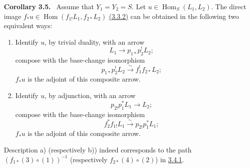 \documentclass[11pt]{article}
\newenvironment{statement}[1]{\par\medskip\noindent\textbf{#1.}\ }{\par\medskip}
\DeclareMathOperator{\Hom}{Hom}
\providecommand{\Hom}{\operatorname{Hom}}
\providecommand{\Hom}{\operatorname{Hom}}
\begin{document}
\label{sga5:III:corollary:3.5}\begin{statement}{Corollary 3.5}
Assume that $Y_1=Y_2=S$. Let $u\in\Hom_S(L_1,L_2)$. The direct image $f_*u\in\Hom(f_{1!}L_1,f_{2*}L_2)$ \hyperref[sga5:III:equation:3.3.2]{(3.3.2)} can be obtained in the following two equivalent ways:
\end{statement}
\begin{enumerate}[label=\alph*)]
\item Identify $u$, by trivial duality, with an arrow
\[
L_1\longrightarrow p_{1*}p_2^!L_2;
\]
compose with the base-change isomorphism
\[
p_{1*}p_2^!L_2\xrightarrow{\sim}f_1^!f_{2*}L_2;
\]
$f_*u$ is the adjoint of this composite arrow.
\item Identify $u$, by adjunction, with an arrow
\[
p_{2!}p_1^*L_1\longrightarrow L_2;
\]
compose with the base-change isomorphism
\[
f_2^*f_{1!}L_1\xrightarrow{\sim}p_{2!}p_1^*L_1;
\]
$f_*u$ is the adjoint of this composite arrow.
\end{enumerate}
Description a) (respectively b)) indeed corresponds to the path $(f_{1*}(3)\circ(1))^{-1}$ (respectively $f_{2*}(4)\circ(2)$) in \hyperref[sga5:III:equation:3.4.1]{3.4.1}.
\end{document}
